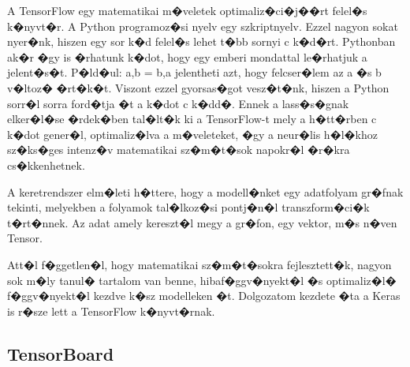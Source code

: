 \documentclass[12pt]{report}
\theoremstyle{definition}
\begin{document}
A TensorFlow egy matematikai m�veletek optimaliz�ci�j��rt felel�s k�nyvt�r. A 
Python programoz�si nyelv egy szkriptnyelv. Ezzel nagyon sokat nyer�nk, hiszen 
egy sor k�d felel�s lehet t�bb sornyi c k�d�rt. Pythonban ak�r �gy is �rhatunk 
k�dot, hogy egy emberi mondattal le�rhatjuk a jelent�s�t.
P�ld�ul: a,b = b,a jelentheti azt, hogy felcser�lem az a �s b v�ltoz� �rt�k�t.
Viszont ezzel gyorsas�got vesz�t�nk, hiszen a Python sorr�l sorra ford�tja �t a 
k�dot c k�dd�. Ennek a lass�s�gnak elker�l�se �rdek�ben tal�lt�k ki a 
TensorFlow-t mely a h�tt�rben c k�dot gener�l, optimaliz�lva a m�veleteket, �gy 
a neur�lis h�l�khoz sz�ks�ges intenz�v matematikai sz�m�t�sok napokr�l �r�kra 
cs�kkenhetnek.

A keretrendszer elm�leti h�ttere, hogy a modell�nket egy adatfolyam gr�fnak 
tekinti, melyekben a folyamok tal�lkoz�si pontj�n�l transzform�ci�k t�rt�nnek. 
Az adat amely kereszt�l megy a gr�fon, egy vektor, m�s n�ven Tensor. %

Att�l f�ggetlen�l, hogy matematikai sz�m�t�sokra fejlesztett�k, nagyon sok m�ly 
tanul� tartalom van benne, hibaf�ggv�nyekt�l �s optimaliz�l� f�ggv�nyekt�l 
kezdve k�sz modelleken �t. Dolgozatom kezdete �ta a Keras is r�sze lett a 
TensorFlow k�nyvt�rnak.

\subsection{TensorBoard}
\end{document}
